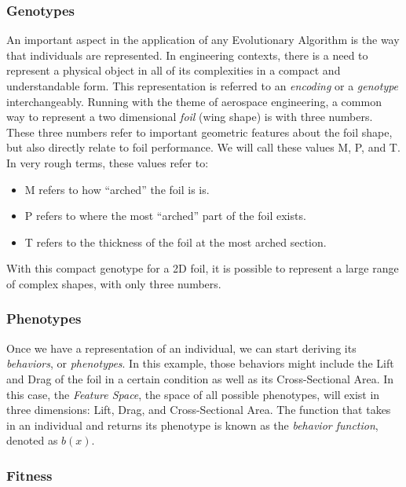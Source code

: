 \documentclass{sig-alternate}
\begin{document}
\subsubsection{Genotypes}
\label{sec:genotypes}

An important aspect in the application of any Evolutionary Algorithm is the way that individuals are represented.
In engineering contexts, there is a need to represent a physical object in all of its complexities in a compact and understandable form.
This representation is referred to an \textit{encoding} or a \textit{genotype} interchangeably.
Running with the theme of aerospace engineering, a common way to represent a two dimensional \textit{foil} (wing shape) is with three numbers.
These three numbers refer to important geometric features about the foil shape, but also directly relate to foil performance.
We will call these values M, P, and T. In very rough terms, these values refer to:
\begin{itemize}
  \item M refers to how ``arched'' the foil is is.
  \item P refers to where the most ``arched'' part of the foil exists.
  \item T refers to the thickness of the foil at the most arched section.
\end{itemize}
With this compact genotype for a 2D foil, it is possible to represent a large range of complex shapes, with only three numbers.

\subsubsection{Phenotypes}
\label{sec:phenotypes}

Once we have a representation of an individual, we can start deriving its \textit{behaviors}, or \textit{phenotypes}.
In this example, those behaviors might include the Lift and Drag of the foil in a certain condition as well as its Cross-Sectional Area.
In this case, the \textit{Feature Space}, the space of all possible phenotypes, will exist in three dimensions: Lift, Drag, and Cross-Sectional Area.
The function that takes in an individual and returns its phenotype is known as the \textit{behavior function}, denoted as $b(x)$.

\subsubsection{Fitness}
\label{sec:fitness}
\end{document}
